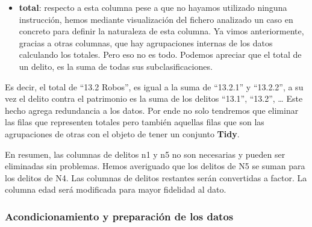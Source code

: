 \documentclass[,,,,pdftex]{Definitions/mdpi}
\providecommand{\tightlist}{%
  \setlength{\itemsep}{0pt}\setlength{\parskip}{0pt}}
\begin{document}
\begin{itemize}
\tightlist
\item
  \textbf{total}: respecto a esta columna pese a que no hayamos
  utilizado ninguna instrucción, hemos mediante visualización del
  fichero analizado un caso en concreto para definir la naturaleza de
  esta columna. Ya vimos anteriormente, gracias a otras columnas, que
  hay agrupaciones internas de los datos calculando los totales. Pero
  eso no es todo. Podemos apreciar que el total de un delito, es la suma
  de todas sus subclasificaciones.
\end{itemize}

Es decir, el total de ``13.2 Robos'', es igual a la suma de ``13.2.1'' y
``13.2.2'', a su vez el delito contra el patrimonio es la suma de los
delitos ``13.1'', ``13.2'', \ldots{} Este hecho agrega redundancia a los
datos. Por ende no solo tendremos que eliminar las filas que representen
totales pero también aquellas filas que son las agrupaciones de otras
con el objeto de tener un conjunto \textbf{Tidy}.

En resumen, las columnas de delitos n1 y n5 no son necesarias y pueden
ser eliminadas sin problemas. Hemos averiguado que los delitos de N5 se
suman para los delitos de N4. Las columnas de delitos restantes serán
convertidas a factor. La columna edad será modificada para mayor
fidelidad al dato.

\subsubsection{Acondicionamiento y preparación de los
datos}\label{acondicionamiento-y-preparaciuxf3n-de-los-datos}
\end{document}
